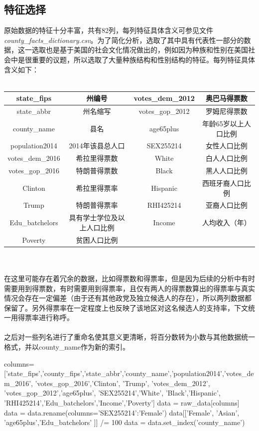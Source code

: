 \documentclass[
12pt, %
UTF8
]{fphw}
\begin{document}
	\subsection{特征选择}
	原始数据的特征十分丰富，共有82列，每列特征具体含义可参见文件\emph{county\_facts\_dictionary.csv}。为了简化分析，选取了其中具有代表性一部分的数据，这一选取也是基于美国的社会文化情况做出的，例如因为种族和性别在美国社会中是很重要的议题，所以选取了大量种族结构和性别结构的特征。每列特征具体含义如下：
	\\
	\\
	\begin{tabular}{|c|c||c|c|}
		\hline
		state\_fips & 州编号 & votes\_dem\_2012 &奥巴马得票数 \\
		\hline
		state\_abbr & 州名缩写 & votes\_gop\_2012 & 罗姆尼得票数\\
		\hline
		county\_name & 县名 & age65plus & 年龄65岁以上人口比例 \\
		\hline
		population2014 & 2014年该县总人口 & SEX255214& 女性人口比例\\
		\hline
		votes\_dem\_2016 & 希拉里得票数&White&白人人口比例\\
		\hline
		votes\_gop\_2016 & 特朗普得票数&Black&黑人人口比例\\
		\hline
		Clinton & 希拉里得票率&Hispanic&西班牙裔人口比例\\
		\hline
		Trump & 特朗普得票率&RHI425214&亚裔人口比例\\
		\hline
		Edu\_batchelors&具有学士学位及以上人口比例&Income&人均收入（年）\\
		\hline
		Poverty & 贫困人口比例&&\\
		\hline
	\end{tabular}
\\
\\
	在这里可能存在着冗余的数据，比如得票数和得票率，但是因为后续的分析中有时需要用到得票数，有时需要用到得票率，且仅有两人的得票数算出的得票率与真实情况会存在一定偏差（由于还有其他政党及独立候选人的存在），所以两列数据都保留了。另外得票率在一定程度上也反映了该地区对这名候选人的支持率，下文统一用得票率进行称呼。
\\
\\
之后对一些列名进行了重命名使其意义更清晰，将百分数转为小数与其他数据统一格式，并以county\_name作为新的索引。
\begin{python}
	 columns=['state_fips','county_fips','state_abbr','county_name','population2014','votes_dem_2016', 'votes_gop_2016','Clinton', 'Trump',
	  'votes_dem_2012', 'votes_gop_2012','age65plus', 'SEX255214','White',
	  'Black','Hispanic', 'RHI425214','Edu_batchelors','Income','Poverty']
	data = raw_data[columns]
	data = data.rename(columns={'SEX255214':'Female'})
	data[['Female', 'Asian', 'age65plus','Edu_batchelors' ]] /= 100
	data = data.set_index('county_name')
\end{python}
\end{document}

